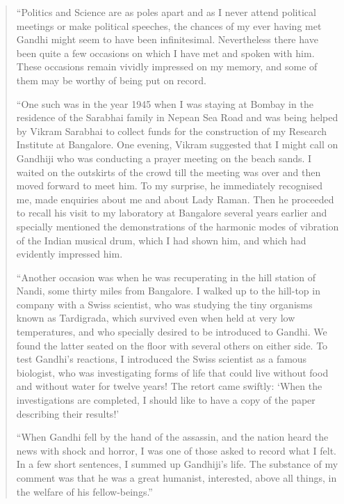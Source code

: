 \begin{quote}
{\fontsize{10pt}{12pt}\selectfont
``Politics and Science are as poles apart and as I never attend political meetings or make political speeches, the chances of my ever having met Gandhi might seem to have been infinitesimal. Nevertheless there have been quite a few occasions on which I have met and spoken with him. These occasions remain vividly impressed on my memory, and some of them may be worthy of being put on record.

``One such was in the year 1945 when I was staying at Bombay in the residence of the Sarabhai family in Nepean Sea Road and was being helped by Vikram Sarabhai to collect funds for the construction of my Research Institute at Bangalore. One evening, Vikram suggested that I might call on Gandhiji who was conducting a prayer meeting on the beach sands. I waited on the outskirts of the crowd till the meeting was over and then moved forward to meet him. To my surprise, he immediately recognised me, made enquiries about me and about Lady Raman. Then he proceeded to recall his visit to my laboratory at Bangalore several years earlier and specially mentioned the demonstrations of the harmonic modes of vibration of the Indian musical drum, which I had shown him, and which had evidently impressed him.

``Another occasion was when he was recuperating in the hill station of Nandi, some thirty miles from Bangalore. I walked up to the hill-top in company with a Swiss scientist, who was studying the tiny organisms known as Tardigrada, which survived even when held at very low temperatures, and who specially desired to be introduced to Gandhi. We found the latter seated on the floor with several others on either side. To test Gandhi's reactions, I introduced the Swiss scientist as a famous biologist, who was investigating forms of life that could live without food and without water for twelve years! The retort came swiftly: `When the investigations are completed, I should like to have a copy of the paper describing their results!'

``When Gandhi fell by the hand of the assassin, and the nation heard the news with shock and horror, I was one of those asked to record what I felt. In a few short sentences, I summed up Gandhiji's life. The substance of my comment was that he was a great humanist, interested, above all things, in the welfare of his fellow-beings.''}\relax
\end{quote}

